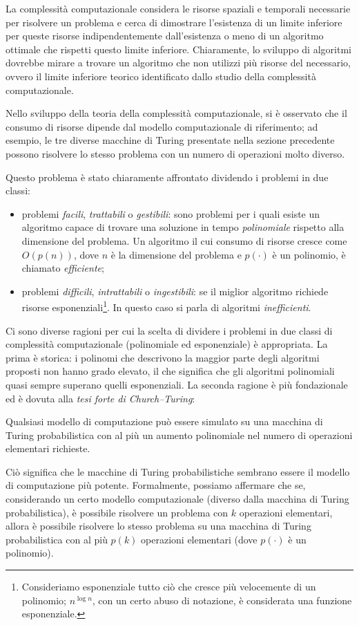 La complessità computazionale considera le risorse spaziali e temporali necessarie per risolvere un problema e cerca di dimostrare l'esistenza di un limite inferiore per queste risorse indipendentemente dall'esistenza o meno di un algoritmo ottimale che rispetti questo limite inferiore. Chiaramente, lo sviluppo di algoritmi dovrebbe mirare a trovare un algoritmo che non utilizzi più risorse del necessario, ovvero il limite inferiore teorico identificato dallo studio della complessità computazionale.

Nello sviluppo della teoria della complessità computazionale, si è osservato che il consumo di risorse dipende dal modello computazionale di riferimento; ad esempio, le tre diverse macchine di Turing presentate nella sezione precedente possono risolvere lo stesso problema con un numero di operazioni molto diverso.

Questo  problema è stato chiaramente affrontato dividendo i problemi in due classi:
\begin{itemize}
	\item problemi \emph{facili}, \emph{trattabili} o \emph{gestibili}: sono problemi per i quali esiste un algoritmo capace di trovare una soluzione in tempo \emph{polinomiale} rispetto alla dimensione del problema. Un algoritmo il cui consumo di risorse cresce come $O(p(n))$, dove $n$ è la dimensione del problema e $p(\cdot)$ è un polinomio, è chiamato \emph{efficiente};
	\item problemi \emph{difficili}, \emph{intrattabili} o \emph{ingestibili}: se il miglior algoritmo richiede risorse esponenziali\footnote{Consideriamo esponenziale tutto ciò che cresce più velocemente di un polinomio; $n^{\log n}$, con un certo abuso di notazione, è considerata una funzione esponenziale.}. In questo caso si parla di algoritmi \emph{inefficienti}.
\end{itemize}

Ci sono diverse ragioni per cui la scelta di dividere i problemi in due classi di complessità computazionale (polinomiale ed esponenziale) è appropriata. La prima è storica: i polinomi che descrivono la maggior parte degli algoritmi proposti non hanno grado elevato, il che significa che gli algoritmi polinomiali quasi sempre superano quelli esponenziali. La seconda ragione è più fondazionale ed è dovuta alla \emph{tesi forte di Church–Turing}:
\begin{thesis}
	Qualsiasi modello di computazione può essere simulato su una macchina di Turing probabilistica con al più un aumento polinomiale nel numero di operazioni elementari richieste.
\end{thesis}
Ciò significa che le macchine di Turing probabilistiche sembrano essere il modello di computazione  più potente. Formalmente, possiamo affermare che se, considerando un certo modello computazionale (diverso dalla macchina di Turing probabilistica), è possibile risolvere un problema con $k$ operazioni elementari, allora è possibile risolvere lo stesso problema su una macchina di Turing probabilistica con al più $p(k)$ operazioni elementari (dove $p(\cdot)$ è un polinomio).

